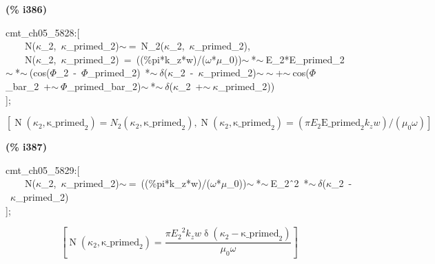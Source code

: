 \documentclass[fleqn]{article}
\begin{document}
\noindent
\begin{minipage}[t]{4.000000em}\color{red}\bfseries
(\% i386)	
\end{minipage}
\begin{minipage}[t]{\textwidth}\color{blue}
cmt\_ch05\_5828:[\\
\ \ \ \ N(\ensuremath{\kappa}\_2,\ \ensuremath{\kappa}\_primed\_2)\ensuremath{\sim\ }=\ N\_2(\ensuremath{\kappa}\_2,\ \ensuremath{\kappa}\_primed\_2),\\
\ \ \ \ N(\ensuremath{\kappa}\_2,\ \ensuremath{\kappa}\_primed\_2)\ =\ ((\%pi*k\_z*w)/(\ensuremath{\omega}*\ensuremath{\mu}\_0))\ensuremath{\sim\ }*\ensuremath{\sim\ }E\_2*E\_primed\_2\ensuremath{\sim\ }*\ensuremath{\sim\ }(cos(\ensuremath{\Phi}\_2\ -\ \ensuremath{\Phi}\_primed\_2)\ *\ensuremath{\sim\ }\ensuremath{\delta}(\ensuremath{\kappa}\_2\ -\ \ensuremath{\kappa}\_primed\_2)\ensuremath{\sim\ }\ensuremath{\sim\ }+\ensuremath{\sim\ }cos(\ensuremath{\Phi}\_bar\_2\ +\ensuremath{\sim\ }\ensuremath{\Phi}\_primed\_bar\_2)\ensuremath{\sim\ }*\ensuremath{\sim\ }\ensuremath{\delta}(\ensuremath{\kappa}\_2\ +\ensuremath{\sim\ }\ensuremath{\kappa}\_primed\_2))\\
];
\end{minipage}
\[\displaystyle \tag{\% o386} 
\operatorname{[}\operatorname{N}\left( {{\kappa }_2}\operatorname{,}{{\ensuremath{\mathrm{\kappa \_ primed}}}_2}\right) ={N_2}\left( {{\kappa }_2}\operatorname{,}{{\ensuremath{\mathrm{\kappa \_ primed}}}_2}\right) \operatorname{,}\operatorname{N}\left( {{\kappa }_2}\operatorname{,}{{\ensuremath{\mathrm{\kappa \_ primed}}}_2}\right) =\left( \ensuremath{\pi}  {E_2} {{\ensuremath{\mathrm{E\_ primed}}}_2} {k_z} w \right) /\left( {{\mu }_0} \omega \right) \operatorname{]}\mbox{}
\]


\noindent
\begin{minipage}[t]{4.000000em}\color{red}\bfseries
(\% i387)	
\end{minipage}
\begin{minipage}[t]{\textwidth}\color{blue}
cmt\_ch05\_5829:[\\
\ \ \ \ N(\ensuremath{\kappa}\_2,\ \ensuremath{\kappa}\_primed\_2)\ensuremath{\sim\ }=\ ((\%pi*k\_z*w)/(\ensuremath{\omega}*\ensuremath{\mu}\_0))\ensuremath{\sim\ }*\ensuremath{\sim\ }E\_2\^\ 2\ *\ensuremath{\sim\ }\ensuremath{\delta}(\ensuremath{\kappa}\_2\ -\ \ensuremath{\kappa}\_primed\_2)\\
];
\end{minipage}
\[\displaystyle \tag{\% o387} 
\left[ \operatorname{N}\left( {{\kappa }_2}\operatorname{,}{{\ensuremath{\mathrm{\kappa \_ primed}}}_2}\right) =\frac{\ensuremath{\pi}  {{{E_2}}^{2}} {k_z} w \operatorname{\delta }\left( {{\kappa }_2}-{{\ensuremath{\mathrm{\kappa \_ primed}}}_2}\right) }{{{\mu }_0} \omega }\right] \mbox{}
\]
\end{document}

